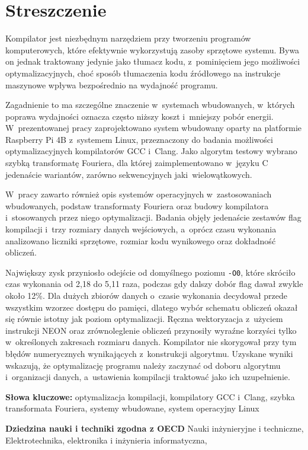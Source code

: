 \chapter*{Streszczenie}
Kompilator jest niezbędnym narzędziem przy tworzeniu programów komputerowych,
które efektywnie wykorzystują zasoby sprzętowe systemu. Bywa on jednak
traktowany jedynie jako tłumacz kodu, z~pominięciem jego możliwości
optymalizacyjnych, choć sposób tłumaczenia kodu źródłowego na instrukcje
maszynowe wpływa bezpośrednio na wydajność programu.

Zagadnienie to ma szczególne znaczenie w~systemach
wbudowanych, w~których poprawa wydajności oznacza często niższy
koszt i~mniejszy pobór energii. W~prezentowanej pracy zaprojektowano system
wbudowany oparty na platformie Raspberry Pi 4B z~systemem Linux, przeznaczony do
badania możliwości optymalizacyjnych kompilatorów GCC i~Clang. Jako algorytm
testowy wybrano szybką transformatę Fouriera, dla której zaimplementowano
w~języku C jedenaście wariantów, zarówno sekwencyjnych jaki~wielowątkowych. 

W~pracy zawarto również opis systemów operacyjnych w~zastosowaniach wbudowanych, podstaw
transformaty Fouriera oraz budowy kompilatora i~stosowanych przez niego
optymalizacji. Badania objęły jedenaście zestawów flag kompilacji i~trzy
rozmiary danych wejściowych, a~oprócz czasu wykonania analizowano liczniki
sprzętowe, rozmiar kodu wynikowego oraz dokładność obliczeń.

Największy zysk
przyniosło odejście od domyślnego poziomu \texttt{-O0}, które skróciło czas
wykonania od 2,18 do 5,11 raza, podczas gdy dalszy dobór flag dawał zwykle
około 12\%. Dla dużych zbiorów danych o~czasie wykonania decydował przede
wszystkim wzorzec dostępu do pamięci, dlatego wybór schematu obliczeń okazał
się równie istotny jak poziom optymalizacji. Ręczna wektoryzacja z~użyciem
instrukcji NEON oraz zrównoleglenie obliczeń przynosiły wyraźne korzyści tylko
w~określonych zakresach rozmiaru danych. Kompilator nie skorygował przy tym
błędów numerycznych wynikających z~konstrukcji algorytmu. Uzyskane wyniki
wskazują, że optymalizację programu należy zaczynać od doboru algorytmu
i~organizacji danych, a~ustawienia kompilacji traktować jako ich uzupełnienie.

\bigskip

\noindent\textbf{Słowa kluczowe:} optymalizacja kompilacji, kompilatory GCC i~Clang, szybka transformata Fouriera, systemy wbudowane, system operacyjny Linux

\bigskip

\noindent\textbf{Dziedzina nauki i techniki zgodna z OECD} Nauki inżynieryjne i techniczne, Elektrotechnika, elektronika i inżynieria informatyczna,
